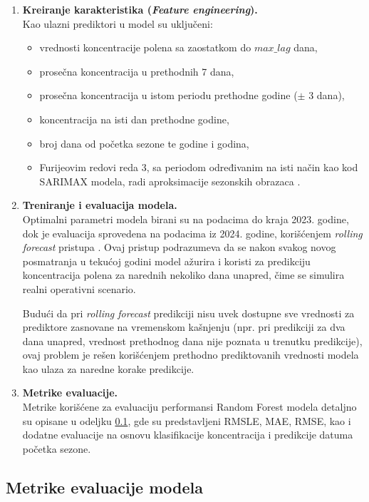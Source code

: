 \documentclass[12pt]{article}
\begin{document}
\begin{enumerate}
    \item \textbf{Kreiranje karakteristika (\textit{Feature engineering}).} \\
    Kao ulazni prediktori u model su uključeni:
    \begin{itemize}
        \item vrednosti koncentracije polena sa zaostatkom do $max\_lag$ dana,
        \item prosečna koncentracija u prethodnih 7 dana,
        \item prosečna koncentracija u istom periodu prethodne godine ($\pm$ 3 dana),
        \item koncentracija na isti dan prethodne godine,
        \item broj dana od početka sezone te godine i godina,
        \item Furijeovim redovi reda 3, sa periodom određivanim na isti način kao kod SARIMAX modela, radi aproksimacije sezonskih obrazaca \cite{yule1927, slutsky1937}.
    \end{itemize}

    \item \textbf{Treniranje i evaluacija modela.} \\
    Optimalni parametri modela birani su na podacima do kraja 2023. godine, dok je evaluacija sprovedena na podacima iz 2024. godine, korišćenjem \textit{rolling forecast} pristupa \cite{bergmeir2012use}. Ovaj pristup podrazumeva da se nakon svakog novog posmatranja u tekućoj godini model ažurira i koristi za predikciju koncentracija polena za narednih nekoliko dana unapred, čime se simulira realni operativni scenario.

    Budući da pri \textit{rolling forecast} predikciji nisu uvek dostupne sve vrednosti za prediktore zasnovane na vremenskom kašnjenju (npr. pri predikciji za dva dana unapred, vrednost prethodnog dana nije poznata u trenutku predikcije), ovaj problem je rešen korišćenjem prethodno prediktovanih vrednosti modela kao ulaza za naredne korake predikcije.

    \item \textbf{Metrike evaluacije.} \\
    Metrike korišćene za evaluaciju performansi Random Forest modela detaljno su opisane u odeljku \ref{sec:evaluation_metrics}, gde su predstavljeni RMSLE, MAE, RMSE, kao i dodatne evaluacije na osnovu klasifikacije koncentracija i predikcije datuma početka sezone.
\end{enumerate}

\subsection{Metrike evaluacije modela}
\label{sec:evaluation_metrics}
\end{document}
